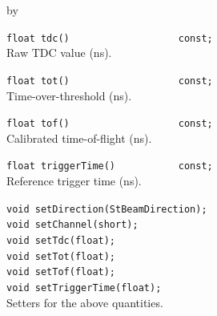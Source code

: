 \documentclass[twoside]{article}
\newcommand{\entrylabel}[1]{\mbox{\textbf{{#1}}}\hfil}%
\newenvironment{entry}
{\begin{list}{}%
    {\renewcommand{\makelabel}{\entrylabel}%
     \setlength{\labelwidth}{90pt}%
     \setlength{\leftmargin}{\labelwidth}
     \advance\leftmargin by \labelsep%
      }%
    }%
  {\end{list}}
\newcommand{\Entrylabel}[1]%
{\raisebox{0pt}[1ex][0pt]{\makebox[\labelwidth][l]%
    {\parbox[t]{\labelwidth}{\hspace{0pt}\textbf{{#1}}}}}}
\newenvironment{Entry}%
{\renewcommand{\entrylabel}{\Entrylabel}\begin{entry}}%
  {\end{entry}}
\begin{document}
\begin{Entry}
    \verb+float tdc()                   const;+\\
    Raw TDC value (ns).

    \verb+float tot()                   const;+\\
    Time-over-threshold (ns).

    \verb+float tof()                   const;+\\
    Calibrated time-of-flight (ns).

    \verb+float triggerTime()           const;+\\
    Reference trigger time (ns).

    \verb+void setDirection(StBeamDirection);+\\
    \verb+void setChannel(short);+\\
    \verb+void setTdc(float);+\\
    \verb+void setTot(float);+\\
    \verb+void setTof(float);+\\
    \verb+void setTriggerTime(float);+\\
    Setters for the above quantities.
\end{Entry}
\clearpage

\printindex
\end{document}
